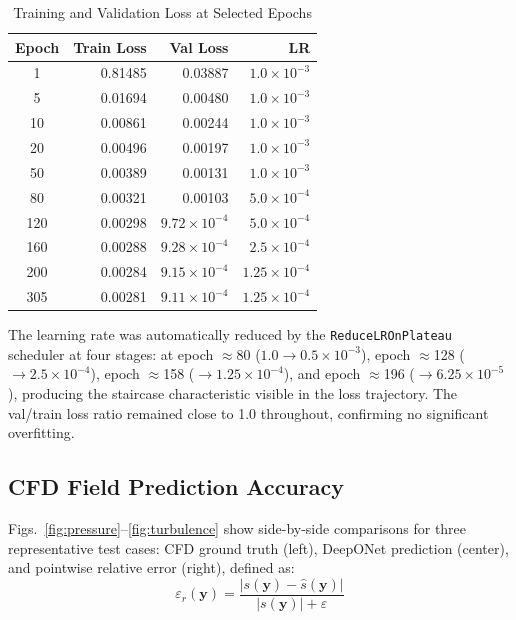 \documentclass[conference]{IEEEtran}
\begin{document}
\begin{table}[htbp]
\caption{Training and Validation Loss at Selected Epochs}
\label{tab:loss_history}
\centering
\begin{tabular}{crrr}
\toprule
\textbf{Epoch} & \textbf{Train Loss} & \textbf{Val Loss} & \textbf{LR} \\
\midrule
1   & 0.81485 & 0.03887 & $1.0\times10^{-3}$ \\
5   & 0.01694 & 0.00480 & $1.0\times10^{-3}$ \\
10  & 0.00861 & 0.00244 & $1.0\times10^{-3}$ \\
20  & 0.00496 & 0.00197 & $1.0\times10^{-3}$ \\
50  & 0.00389 & 0.00131 & $1.0\times10^{-3}$ \\
80  & 0.00321 & 0.00103 & $5.0\times10^{-4}$ \\
120 & 0.00298 & $9.72\times10^{-4}$ & $5.0\times10^{-4}$ \\
160 & 0.00288 & $9.28\times10^{-4}$ & $2.5\times10^{-4}$ \\
200 & 0.00284 & $9.15\times10^{-4}$ & $1.25\times10^{-4}$ \\
305 & 0.00281 & $9.11\times10^{-4}$ & $1.25\times10^{-4}$ \\
\bottomrule
\end{tabular}
\end{table}

The learning rate was automatically reduced by the \texttt{ReduceLROnPlateau} scheduler at four stages: at epoch $\approx$80 ($1.0 \to 0.5 \times 10^{-3}$), epoch $\approx$128 ($\to 2.5\times10^{-4}$), epoch $\approx$158 ($\to 1.25\times10^{-4}$), and epoch $\approx$196 ($\to 6.25\times10^{-5}$), producing the staircase characteristic visible in the loss trajectory. The val/train loss ratio remained close to 1.0 throughout, confirming no significant overfitting.

\subsection{CFD Field Prediction Accuracy}

Figs.~\ref{fig:pressure}–\ref{fig:turbulence} show side-by-side comparisons for three representative test cases: CFD ground truth (left), DeepONet prediction (center), and pointwise relative error (right), defined as:
\begin{equation}
\varepsilon_r(\mathbf{y}) = \frac{|s(\mathbf{y}) - \hat{s}(\mathbf{y})|}{|s(\mathbf{y})| + \varepsilon}
\label{eq:rel_err}
\end{equation}
\end{document}
